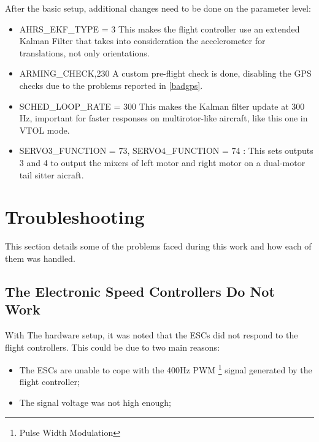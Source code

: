 After the basic setup, additional changes need to be done on the parameter level:
\begin{itemize}
\item AHRS\_EKF\_TYPE = 3 This makes the flight controller use an extended Kalman Filter that takes into consideration the accelerometer for translations, not only orientations.

\item ARMING\_CHECK,230 A custom pre-flight check is done, disabling the GPS checks due to the problems reported in \ref{badgps}.

\item SCHED\_LOOP\_RATE = 300 This makes the Kalman filter update at 300 Hz, important for faster responses on multirotor-like aircraft, like this one in VTOL mode.

\item SERVO3\_FUNCTION = 73, SERVO4\_FUNCTION = 74 : This sets outputs 3 and 4 to output the mixers of left motor and right motor on a dual-motor tail sitter aicraft.

\end{itemize}




\section{Troubleshooting}

This section details some of the problems faced during this work and how each of them was handled.

\subsection{The Electronic Speed Controllers Do Not Work}
With The hardware setup, it was noted that the ESCs did not respond to the flight controllers. This could be due to two main reasons:
\begin{itemize}
\item The ESCs are unable to cope with the 400Hz PWM \footnote{Pulse Width Modulation} signal generated by the flight controller;
\item The signal voltage was not high enough;
\end{itemize}

